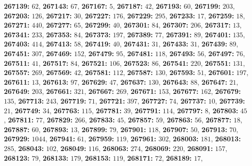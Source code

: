 \textsf{\bfseries 267139:} $62$, \textsf{\bfseries 267143:} $67$, \textsf{\bfseries 267167:} $5$, \textsf{\bfseries 267187:} $42$, \textsf{\bfseries 267193:} $60$, \textsf{\bfseries 267199:} $203$, \textsf{\bfseries 267203:} $126$, \textsf{\bfseries 267217:} $30$, \textsf{\bfseries 267227:} $176$, \textsf{\bfseries 267229:} $295$, \textsf{\bfseries 267233:} $17$, \textsf{\bfseries 267259:} $18$, \textsf{\bfseries 267271:} $440$, \textsf{\bfseries 267277:} $65$, \textsf{\bfseries 267299:} $40$, \textsf{\bfseries 267301:} $84$, \textsf{\bfseries 267307:} $206$, \textsf{\bfseries 267317:} $13$, \textsf{\bfseries 267341:} $233$, \textsf{\bfseries 267353:} $84$, \textsf{\bfseries 267373:} $197$, \textsf{\bfseries 267389:} $77$, \textsf{\bfseries 267391:} $89$, \textsf{\bfseries 267401:} $135$, \textsf{\bfseries 267403:} $414$, \textsf{\bfseries 267413:} $58$, \textsf{\bfseries 267419:} $40$, \textsf{\bfseries 267431:} $31$, \textsf{\bfseries 267433:} $31$, \textsf{\bfseries 267439:} $89$, \textsf{\bfseries 267451:} $307$, \textsf{\bfseries 267469:} $152$, \textsf{\bfseries 267479:} $95$, \textsf{\bfseries 267481:} $118$, \textsf{\bfseries 267493:} $56$, \textsf{\bfseries 267497:} $76$, \textsf{\bfseries 267511:} $41$, \textsf{\bfseries 267517:} $84$, \textsf{\bfseries 267521:} $106$, \textsf{\bfseries 267523:} $86$, \textsf{\bfseries 267541:} $220$, \textsf{\bfseries 267551:} $131$, \textsf{\bfseries 267557:} $269$, \textsf{\bfseries 267569:} $42$, \textsf{\bfseries 267581:} $112$, \textsf{\bfseries 267587:} $130$, \textsf{\bfseries 267593:} $51$, \textsf{\bfseries 267601:} $197$, \textsf{\bfseries 267611:} $13$, \textsf{\bfseries 267613:} $97$, \textsf{\bfseries 267629:} $47$, \textsf{\bfseries 267637:} $130$, \textsf{\bfseries 267643:} $88$, \textsf{\bfseries 267647:} $21$, \textsf{\bfseries 267649:} $203$, \textsf{\bfseries 267661:} $321$, \textsf{\bfseries 267667:} $269$, \textsf{\bfseries 267671:} $153$, \textsf{\bfseries 267677:} $162$, \textsf{\bfseries 267679:} $135$, \textsf{\bfseries 267713:} $243$, \textsf{\bfseries 267719:} $71$, \textsf{\bfseries 267721:} $397$, \textsf{\bfseries 267727:} $74$, \textsf{\bfseries 267737:} $10$, \textsf{\bfseries 267739:} $21$, \textsf{\bfseries 267749:} $34$, \textsf{\bfseries 267763:} $115$, \textsf{\bfseries 267781:} $39$, \textsf{\bfseries 267791:} $114$, \textsf{\bfseries 267797:} $8$, \textsf{\bfseries 267803:} $45$, \textsf{\bfseries 267811:} $77$, \textsf{\bfseries 267829:} $266$, \textsf{\bfseries 267833:} $45$, \textsf{\bfseries 267857:} $59$, \textsf{\bfseries 267863:} $56$, \textsf{\bfseries 267877:} $18$, \textsf{\bfseries 267887:} $60$, \textsf{\bfseries 267893:} $13$, \textsf{\bfseries 267899:} $79$, \textsf{\bfseries 267901:} $118$, \textsf{\bfseries 267907:} $50$, \textsf{\bfseries 267913:} $70$, \textsf{\bfseries 267929:} $1044$, \textsf{\bfseries 267941:} $61$, \textsf{\bfseries 267959:} $119$, \textsf{\bfseries 267961:} $302$, \textsf{\bfseries 268003:} $181$, \textsf{\bfseries 268013:} $285$, \textsf{\bfseries 268043:} $102$, \textsf{\bfseries 268049:} $116$, \textsf{\bfseries 268063:} $274$, \textsf{\bfseries 268069:} $220$, \textsf{\bfseries 268091:} $157$, \textsf{\bfseries 268123:} $79$, \textsf{\bfseries 268133:} $179$, \textsf{\bfseries 268153:} $119$, \textsf{\bfseries 268171:} $72$, \textsf{\bfseries 268189:} $17$, 
